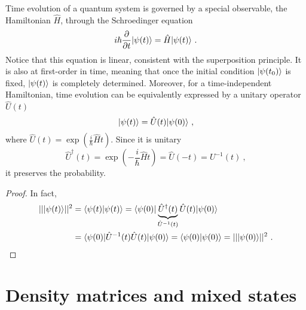    Time evolution of a quantum system is governed by a special observable, the Hamiltonian $\hat H$, through the Schroedinger equation
    \begin{equation*}
        i \hbar \frac{\partial}{\partial t} \vert\psi(t)\rangle = \hat H \vert\psi(t)\rangle ~.
    \end{equation*}
    Notice that this equation is linear, consistent with the superposition principle. It is also at first-order in time, meaning that once the initial condition $\vert\psi(t_0)\rangle$ is fixed, $\vert\psi(t)\rangle$ is completely determined.
    Moreover, for a time-independent Hamiltonian, time evolution can be equivalently expressed by a unitary operator $\hat U(t)$  
    \begin{equation}\label{tev}
        \vert\psi(t)\rangle = \hat U(t) \vert\psi(0)\rangle ~,
    \end{equation}
    where $\hat U(t) = \exp (\frac{i}{\hbar} \hat H t)$. Since it is unitary 
    \begin{equation*}
        \hat U^\dagger (t) = \exp(- \frac{i}{\hbar} \hat H t) = \hat U(-t) = U^{-1} (t) ~,
    \end{equation*}
    it preserves the probability.
    \begin{proof}
        In fact, 
        \begin{equation*}
        \begin{aligned}
            ||\vert\psi(t)\rangle||^2 & = \langle\psi(t)\vert\psi(t)\rangle = \langle\psi(0)\vert \underbrace{\hat U^\dagger (t)}_{\hat U^{-1} (t)} \hat U (t) \vert\psi(0)\rangle \\ & = \langle\psi(0)\vert \hat U^{-1} (t) \hat U (t) \vert\psi(0)\rangle = \langle\psi(0)\vert\psi(0)\rangle = ||\vert\psi(0)\rangle||^2 ~.
        \end{aligned}
        \end{equation*}
    \end{proof}

\section{Density matrices and mixed states}

